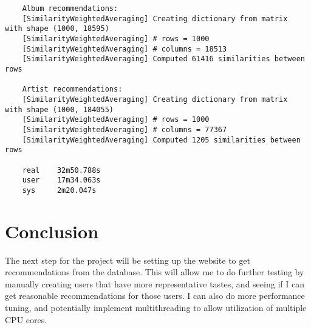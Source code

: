 \documentclass[12pt]{article}
\begin{document}
	\newpage

	\begin{verbatim}
	Album recommendations:
	[SimilarityWeightedAveraging] Creating dictionary from matrix  with shape (1000, 18595)
	[SimilarityWeightedAveraging] # rows = 1000
	[SimilarityWeightedAveraging] # columns = 18513
	[SimilarityWeightedAveraging] Computed 61416 similarities between rows

	Artist recommendations:
	[SimilarityWeightedAveraging] Creating dictionary from matrix  with shape (1000, 184055)
	[SimilarityWeightedAveraging] # rows = 1000
	[SimilarityWeightedAveraging] # columns = 77367
	[SimilarityWeightedAveraging] Computed 1205 similarities between rows

	real    32m50.788s
	user    17m34.063s
	sys     2m20.047s
	\end{verbatim}

	\section*{Conclusion}
	The next step for the project will be setting up the website to get recommendations from the database. This will allow me to do further testing by manually creating users that have more representative tastes, and seeing if I can get reasonable recommendations for those users. I can also do more performance tuning, and potentially implement multithreading to allow utilization of multiple CPU cores.
\end{document}
